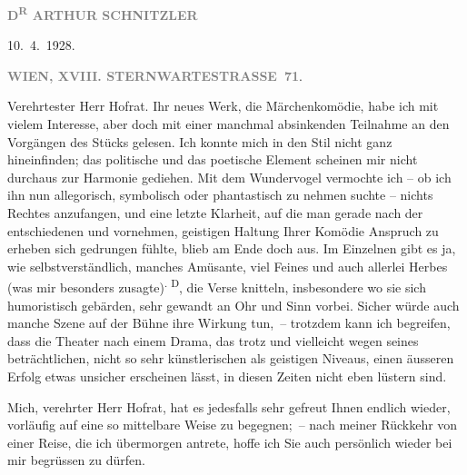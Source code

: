 \pstart
           {\pb}\textcolor{gray}{\textbf{D\textsuperscript{R} ARTHUR SCHNITZLER}}\pend
           
\pstart
           \raggedleft{}10. 4. 1928.\pend
           \pend
           
\pstart
           \textcolor{gray}{\textbf{WIEN, XVIII. STERNWARTESTRASSE 71}}.\pend
           
\pstart{}Verehrtester Herr Hofrat.\pend\vspace{0.5em}
\pstart
           Ihr neues Werk, die Märchenkomödie, habe ich mit
               vielem Interesse, aber doch mit einer manchmal absinkenden Teilnahme an den Vorgängen
               des Stücks gelesen. Ich konnte mich in den Stil nicht ganz hineinfinden; das
               politische und das poetische Element scheinen mir nicht durchaus zur Harmonie
               gediehen. Mit dem Wundervogel vermochte ich – ob ich ihn nun allegorisch, symbolisch
               oder phantastisch zu nehmen suchte – nichts Rechtes anzufangen, und eine letzte
               Klarheit, auf die man gerade nach der entschiedenen und vornehmen, geistigen Haltung
               Ihrer Komödie Anspruch zu erheben sich gedrungen fühlte, blieb am Ende doch aus. Im
               Einzelnen gibt es ja, wie selbstverständlich, manches Amüsante, viel Feines und auch
               allerlei Herbes (was mir besonders zusagte)\substVorne{}\textsuperscript{. D}\substDazwischen{}, d\substHinten{}ie Verse knitteln, insbesondere wo sie sich humoristisch gebärden, sehr
               gewandt an Ohr und Sinn vorbei. Sicher würde auch manche Szene auf der Bühne ihre
               Wirkung tun, – trotzdem kann ich begreifen, dass die Theater nach einem Drama, das trotz  und vielleicht wegen seines beträchtlichen,
               nicht so sehr künstlerischen als geistigen Niveaus, einen äusseren Erfolg etwas
               unsicher erscheinen lässt, in diesen Zeiten nicht eben lüstern sind.\pend
           
\pstart
           Mich, verehrter Herr Hofrat, hat es jedesfalls sehr gefreut Ihnen endlich wieder,
               vorläufig auf eine so mittelbare Weise zu begegnen; – nach meiner Rückkehr von einer
               Reise, die ich übermorgen antrete, hoffe ich Sie auch persönlich wieder bei mir
               begrüssen zu dürfen.\pend
           
